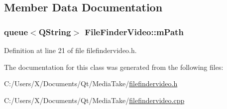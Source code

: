 \subsection{Member Data Documentation}
\hypertarget{class_file_finder_video_a1b7ea45f53c63b4ca04f545a04aafe99}{
\subsubsection[{m\-Path}]{\setlength{\rightskip}{0pt plus 5cm}queue$<$Q\-String$>$ File\-Finder\-Video\-::m\-Path\hspace{0.3cm}{\ttfamily [protected]}}}\label{class_file_finder_video_a1b7ea45f53c63b4ca04f545a04aafe99}


Definition at line 21 of file filefindervideo.\-h.



The documentation for this class was generated from the following files\-:\begin{DoxyCompactItemize}
\item 
C\-:/\-Users/\-X/\-Documents/\-Qt/\-Media\-Take/\hyperlink{filefindervideo_8h}{filefindervideo.\-h}\item 
C\-:/\-Users/\-X/\-Documents/\-Qt/\-Media\-Take/\hyperlink{filefindervideo_8cpp}{filefindervideo.\-cpp}\end{DoxyCompactItemize}
